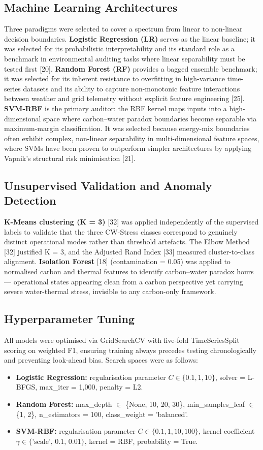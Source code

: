 \documentclass[conference]{IEEEtran}
\begin{document}
\subsection{Machine Learning Architectures}
Three paradigms were selected to cover a spectrum from linear to non-linear decision boundaries. \textbf{Logistic Regression (LR)} serves as the linear baseline; it was selected for its probabilistic interpretability and its standard role as a benchmark in environmental auditing tasks where linear separability must be tested first [20]. \textbf{Random Forest (RF)} provides a bagged ensemble benchmark; it was selected for its inherent resistance to overfitting in high-variance time-series datasets and its ability to capture non-monotonic feature interactions between weather and grid telemetry without explicit feature engineering [25]. \textbf{SVM-RBF} is the primary auditor: the RBF kernel maps inputs into a high-dimensional space where carbon–water paradox boundaries become separable via maximum-margin classification. It was selected because energy-mix boundaries often exhibit complex, non-linear separability in multi-dimensional feature spaces, where SVMs have been proven to outperform simpler architectures by applying Vapnik's structural risk minimisation [21].

\subsection{Unsupervised Validation and Anomaly Detection}
\textbf{K-Means clustering (K = 3)} [32] was applied independently of the supervised labels to validate that the three CW-Stress classes correspond to genuinely distinct operational modes rather than threshold artefacts. The Elbow Method [32] justified K = 3, and the Adjusted Rand Index [33] measured cluster-to-class alignment. \textbf{Isolation Forest} [18] (contamination = 0.05) was applied to normalised carbon and thermal features to identify carbon–water paradox hours — operational states appearing clean from a carbon perspective yet carrying severe water-thermal stress, invisible to any carbon-only framework.

\subsection{Hyperparameter Tuning}
All models were optimised via GridSearchCV with five-fold TimeSeriesSplit scoring on weighted F1, ensuring training always precedes testing chronologically and preventing look-ahead bias. Search spaces were as follows:
\begin{itemize}
    \item \textbf{Logistic Regression:} regularisation parameter $C \in \{0.1, 1, 10\}$, solver = L-BFGS, max\_iter = 1,000, penalty = L2.
    \item \textbf{Random Forest:} max\_depth $\in$ \{None, 10, 20, 30\}, min\_samples\_leaf $\in$ \{1, 2\}, n\_estimators = 100, class\_weight = 'balanced'.
    \item \textbf{SVM-RBF:} regularisation parameter $C \in \{0.1, 1, 10, 100\}$, kernel coefficient $\gamma \in \{\text{'scale', 0.1, 0.01}\}$, kernel = RBF, probability = True.
\end{itemize}
\end{document}
